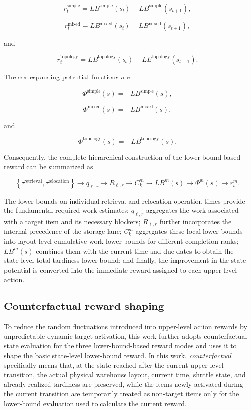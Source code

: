 \[
r_t^{\mathrm{simple}}
=
LB^{\mathrm{simple}}(s_t)
-
LB^{\mathrm{simple}}(s_{t+1}),
\]

\[
r_t^{\mathrm{mixed}}
=
LB^{\mathrm{mixed}}(s_t)
-
LB^{\mathrm{mixed}}(s_{t+1}),
\]

and

\[
r_t^{\mathrm{topology}}
=
LB^{\mathrm{topology}}(s_t)
-
LB^{\mathrm{topology}}(s_{t+1}).
\]

The corresponding potential functions are

\[
\Phi^{\mathrm{simple}}(s)
=
-LB^{\mathrm{simple}}(s),
\]

\[
\Phi^{\mathrm{mixed}}(s)
=
-LB^{\mathrm{mixed}}(s),
\]

and

\[
\Phi^{\mathrm{topology}}(s)
=
-LB^{\mathrm{topology}}(s).
\]

Consequently, the complete hierarchical construction of the lower-bound-based
reward can be summarized as

\[
\left\{
\tau^{\mathrm{retrieval}},
\tau^{\mathrm{relocation}}
\right\}
\longrightarrow
q_{\ell,r}
\longrightarrow
R_{\ell,r}
\longrightarrow
C_k^m
\longrightarrow
LB^m(s)
\longrightarrow
\Phi^m(s)
\longrightarrow
r_t^m.
\]

The lower bounds on individual retrieval and relocation operation times provide
the fundamental required-work estimates; \(q_{\ell,r}\) aggregates the work
associated with a target item and its necessary blockers; \(R_{\ell,r}\)
further incorporates the internal precedence of the storage lane;
\(C_k^m\) aggregates these local lower bounds into layout-level cumulative work
lower bounds for different completion ranks; \(LB^m(s)\) combines them with the
current time and due dates to obtain the state-level total-tardiness lower bound;
and finally, the improvement in the state potential is converted into the
immediate reward assigned to each upper-level action.
\subsection{Counterfactual reward shaping}

To reduce the random fluctuations introduced into upper-level action rewards by unpredictable dynamic target activation, this work further adopts counterfactual state evaluation for the three lower-bound-based reward modes and uses it to shape the basic state-level lower-bound reward. In this work, \emph{counterfactual} specifically means that, at the state reached after the current upper-level transition, the actual physical warehouse layout, current time, shuttle state, and already realized tardiness are preserved, while the items newly activated during the current transition are temporarily treated as non-target items only for the lower-bound evaluation used to calculate the current reward.

